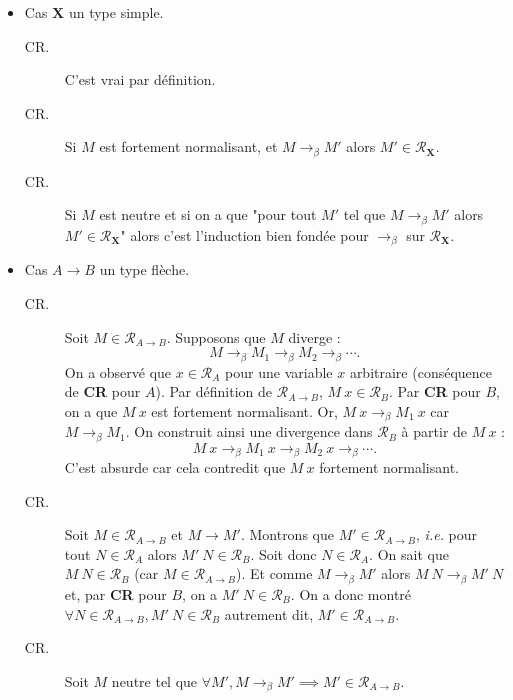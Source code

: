 \documentclass[./main]{subfiles}
\begin{document}
\begin{prv}
    \begin{itemize}
      \item Cas $\boldsymbol{X}$ un type simple.
        \begin{description}
          \item[CR.] C'est vrai par définition.
          \item[CR.] Si $M$ est fortement normalisant, et $M \to_\beta M'$ alors $M' \in \mathcal{R}_{\boldsymbol{X}}$.
          \item[CR.] Si $M$ est neutre et si on a que "pour tout $M'$ tel que $M \to_\beta M'$ alors $M' \in \mathcal{R}_{\boldsymbol{X}}$" alors c'est l'induction bien fondée pour $\to_\beta$ sur $\mathcal{R}_{\boldsymbol{X}}$.
        \end{description}
      \item Cas $A \to B$ un type flèche.
        \begin{description}
          \item[CR.] Soit $M \in \mathcal{R}_{A \to B}$.
            Supposons que $M$ diverge :
            \[
            M\to_\beta M_1 \to_\beta  M_2 \to_\beta \cdots 
            .\]
            On a observé que $x \in \mathcal{R}_A$ pour une variable $x$ arbitraire (conséquence de \textbf{\textsf{CR}} pour $A$).
            Par définition de $\mathcal{R}_{A \to B}$, $M\: x \in \mathcal{R}_B$.
            Par \textbf{\textsf{CR}} pour $B$, on a que $M \: x$ est fortement normalisant.
            Or,  $M \: x \to_\beta M_1 \: x$ car $M \to_\beta M_1$.
            On construit ainsi une divergence dans $\mathcal{R}_B$ à partir de $M\:x$ :
             \[
            M\: x \to_\beta M_1 \: x \to_\beta M_2 \: x \to_\beta\cdots 
            .\] 
            C'est absurde car cela contredit que $M\:x$ fortement normalisant.
          \item[CR.]
            Soit $M \in \mathcal{R}_{A \to B}$ et $M \to M'$.
            Montrons que $M' \in \mathcal{R}_{A \to B}$, \textit{i.e.} pour tout $N \in \mathcal{R}_A$ alors $M' \: N \in \mathcal{R}_B$.
            Soit donc $N \in \mathcal{R}_A$.
            On sait que $M\:N \in \mathcal{R}_B$ (car $M \in \mathcal{R}_{A \to B}$).
            Et comme $M \to_\beta M'$ alors $M \: N \to_\beta M' \: N$ et, par \textbf{\textsf{CR}} pour $B$, on a $M' \: N \in \mathcal{R}_B$.
            On a donc montré $\forall N \in \mathcal{R}_{A \to B}, M'\: N \in \mathcal{R}_B$ autrement dit, $M' \in \mathcal{R}_{A \to B}$.
          \item[CR.]
            Soit $M$ neutre tel que $\forall M', M \to_\beta M' \implies M' \in \mathcal{R}_{A \to B}$.

\end{description}
\end{itemize}
\end{prv}
\end{document}
